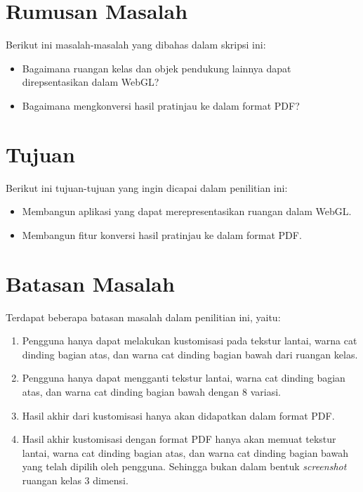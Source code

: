 \section{Rumusan Masalah}
\label{sec:rumusan}
Berikut ini masalah-masalah yang dibahas dalam skripsi ini:
\begin{itemize}
    \item Bagaimana ruangan kelas dan objek pendukung lainnya dapat direpsentasikan dalam WebGL?
    \item Bagaimana mengkonversi hasil pratinjau ke dalam format PDF?
\end{itemize}

\section{Tujuan}
\label{sec:tujuan}
Berikut ini tujuan-tujuan yang ingin dicapai dalam penilitian ini:
\begin{itemize}
    \item Membangun aplikasi yang dapat merepresentasikan ruangan dalam WebGL.
    \item Membangun fitur konversi hasil pratinjau ke dalam format PDF.
\end{itemize}

\section{Batasan Masalah}
\label{sec:batasan}
Terdapat beberapa batasan masalah dalam penilitian ini, yaitu:
\begin{enumerate}
    \item Pengguna hanya dapat melakukan kustomisasi pada tekstur lantai, warna cat dinding bagian atas, dan warna cat dinding bagian bawah dari ruangan kelas.
    \item Pengguna hanya dapat mengganti tekstur lantai, warna cat dinding bagian atas, dan warna cat dinding bagian bawah dengan 8 variasi.
    \item Hasil akhir dari kustomisasi hanya akan didapatkan dalam format PDF.
    \item Hasil akhir kustomisasi dengan format PDF hanya akan memuat tekstur lantai, warna cat dinding bagian atas, dan warna cat dinding bagian bawah yang telah dipilih oleh pengguna. Sehingga bukan dalam bentuk \textit{screenshot} ruangan kelas 3 dimensi.
\end{enumerate}
